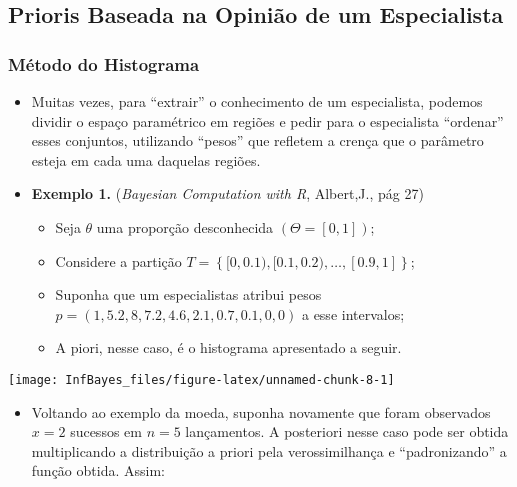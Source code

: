 \documentclass[
]{book}
\providecommand{\tightlist}{%
  \setlength{\itemsep}{0pt}\setlength{\parskip}{0pt}}
\begin{document}
\hypertarget{prioris-baseada-na-opiniuxe3o-de-um-especialista}{%
\subsection{Prioris Baseada na Opinião de um Especialista}\label{prioris-baseada-na-opiniuxe3o-de-um-especialista}}

\hypertarget{muxe9todo-do-histograma}{%
\subsubsection{Método do Histograma}\label{muxe9todo-do-histograma}}

\begin{itemize}
\item
  Muitas vezes, para ``extrair'' o conhecimento de um especialista, podemos dividir o espaço paramétrico em regiões e pedir para o especialista ``ordenar'' esses conjuntos, utilizando ``pesos'' que refletem a crença que o parâmetro esteja em cada uma daquelas regiões.
\item
  \textbf{Exemplo 1.} (\emph{Bayesian Computation with R}, Albert,J., pág 27)

  \begin{itemize}
  \tightlist
  \item
    Seja \(\theta\) uma proporção desconhecida \((\Theta=[0,1])\);\\
  \item
    Considere a partição \(T = \left\{[0,0.1), [0.1,0.2), \ldots, [0.9,1] \right\}\);
  \item
    Suponha que um especialistas atribui pesos \(p=(1, 5.2, 8, 7.2, 4.6, 2.1, 0.7, 0.1, 0, 0)\) a esse intervalos;\\
  \item
    A piori, nesse caso, é o histograma apresentado a seguir.
  \end{itemize}
\end{itemize}

\begin{center}\texttt{[image: InfBayes\_files/figure-latex/unnamed-chunk-8-1]} \end{center}

\begin{itemize}
\tightlist
\item
  Voltando ao exemplo da moeda, suponha novamente que foram observados \(x=2\) sucessos em \(n=5\) lançamentos. A posteriori nesse caso pode ser obtida multiplicando a distribuição a priori pela verossimilhança e ``padronizando'' a função obtida. Assim:
\end{itemize}
\end{document}
